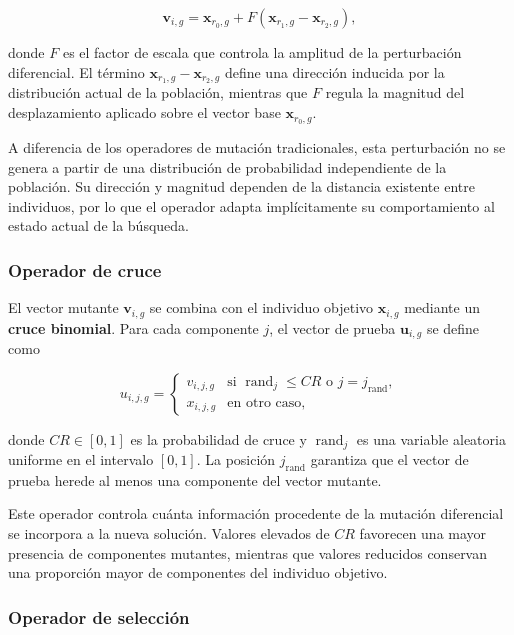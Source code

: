 \[
    \mathbf{v}_{i,g}
    =
    \mathbf{x}_{r_0,g}
    +
    F\left(
    \mathbf{x}_{r_1,g}
    -
    \mathbf{x}_{r_2,g}
    \right),
\]

donde \(F\) es el factor de escala que controla la amplitud de la perturbación diferencial. El término
\(\mathbf{x}_{r_1,g}-\mathbf{x}_{r_2,g}\) define una dirección inducida por la distribución actual de la población, mientras que \(F\) regula la magnitud del desplazamiento aplicado sobre el vector base \(\mathbf{x}_{r_0,g}\).

A diferencia de los operadores de mutación tradicionales, esta perturbación no se genera a partir de una distribución de probabilidad independiente de la población. Su dirección y magnitud dependen de la distancia existente entre individuos, por lo que el operador adapta implícitamente su comportamiento al estado actual de la búsqueda.


\subsubsection{Operador de cruce}


El vector mutante \(\mathbf{v}_{i,g}\) se combina con el individuo objetivo \(\mathbf{x}_{i,g}\) mediante un \textbf{cruce binomial}. Para cada componente \(j\), el vector de prueba \(\mathbf{u}_{i,g}\) se define como

\[
    u_{i,j,g}
    =
    \begin{cases}
        v_{i,j,g}
         & \text{si } \operatorname{rand}_j \leq CR
        \text{ o } j=j_{\text{rand}},               \\
        x_{i,j,g}
         & \text{en otro caso},
    \end{cases}
\]

donde \(CR \in [0,1]\) es la probabilidad de cruce y \(\operatorname{rand}_j\) es una variable aleatoria uniforme en el intervalo \([0,1]\). La posición \(j_{\text{rand}}\) garantiza que el vector de prueba herede al menos una componente del vector mutante.

Este operador controla cuánta información procedente de la mutación diferencial se incorpora a la nueva solución. Valores elevados de \(CR\) favorecen una mayor presencia de componentes mutantes, mientras que valores reducidos conservan una proporción mayor de componentes del individuo objetivo.

\subsubsection{Operador de selección}

